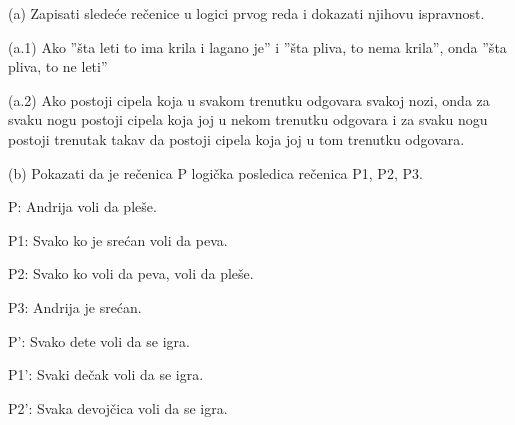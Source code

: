 %
\begin{isabellebody}%
%
%
\isadelimtheory
%
\endisadelimtheory
%
\isatagtheory
%
\endisatagtheory
{\isafoldtheory}%
%
\isadelimtheory
%
\endisadelimtheory
%
\begin{exercise}[subtitle=Zapisivanje logičkih formula (nastavak)]
%
\begin{isamarkuptext}%
(a) Zapisati sledeće rečenice u logici prvog reda i dokazati njihovu ispravnost.%
\end{isamarkuptext}\isamarkuptrue%
%
\begin{isamarkuptext}%
(a.1) Ako ”šta leti to ima krila i lagano je” 
            i ”šta pliva, to nema krila”, 
            onda ”šta pliva, to ne leti”%
\end{isamarkuptext}\isamarkuptrue%
%
\begin{isamarkuptext}%
(a.2) Ako postoji cipela koja u svakom trenutku odgovara svakoj nozi, 
            onda za svaku nogu postoji cipela koja joj u nekom trenutku odgovara 
            i za svaku nogu postoji trenutak takav da postoji cipela koja joj u tom 
            trenutku odgovara.%
\end{isamarkuptext}\isamarkuptrue%
%
\begin{isamarkuptext}%
(b) Pokazati da je rečenica P logička posledica rečenica P1, P2, P3.%
\end{isamarkuptext}\isamarkuptrue%
%
\begin{isamarkuptext}%
P:  Andrija voli da pleše.%
\end{isamarkuptext}\isamarkuptrue%
%
\begin{isamarkuptext}%
P1: Svako ko je srećan voli da peva.%
\end{isamarkuptext}\isamarkuptrue%
%
\begin{isamarkuptext}%
P2: Svako ko voli da peva, voli da pleše.%
\end{isamarkuptext}\isamarkuptrue%
%
\begin{isamarkuptext}%
P3: Andrija je srećan.%
\end{isamarkuptext}\isamarkuptrue%
%
\begin{isamarkuptext}%
P':  Svako dete voli da se igra.%
\end{isamarkuptext}\isamarkuptrue%
%
\begin{isamarkuptext}%
P1': Svaki dečak voli da se igra.%
\end{isamarkuptext}\isamarkuptrue%
%
\begin{isamarkuptext}%
P2': Svaka devojčica voli da se igra.%
\end{isamarkuptext}\isamarkuptrue%

\end{exercise}
\end{isabellebody}
